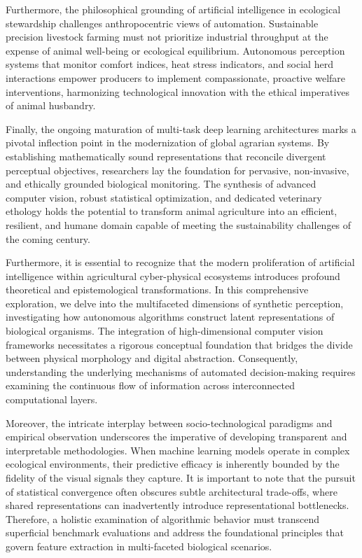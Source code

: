 \documentclass[Times,12pt,oneside,openany,print,index]{report}
\begin{document}
Furthermore, the philosophical grounding of artificial intelligence in ecological stewardship challenges anthropocentric views of automation. Sustainable precision livestock farming must not prioritize industrial throughput at the expense of animal well-being or ecological equilibrium. Autonomous perception systems that monitor comfort indices, heat stress indicators, and social herd interactions empower producers to implement compassionate, proactive welfare interventions, harmonizing technological innovation with the ethical imperatives of animal husbandry.

Finally, the ongoing maturation of multi-task deep learning architectures marks a pivotal inflection point in the modernization of global agrarian systems. By establishing mathematically sound representations that reconcile divergent perceptual objectives, researchers lay the foundation for pervasive, non-invasive, and ethically grounded biological monitoring. The synthesis of advanced computer vision, robust statistical optimization, and dedicated veterinary ethology holds the potential to transform animal agriculture into an efficient, resilient, and humane domain capable of meeting the sustainability challenges of the coming century.

Furthermore, it is essential to recognize that the modern proliferation of artificial intelligence within agricultural cyber-physical ecosystems introduces profound theoretical and epistemological transformations. In this comprehensive exploration, we delve into the multifaceted dimensions of synthetic perception, investigating how autonomous algorithms construct latent representations of biological organisms. The integration of high-dimensional computer vision frameworks necessitates a rigorous conceptual foundation that bridges the divide between physical morphology and digital abstraction. Consequently, understanding the underlying mechanisms of automated decision-making requires examining the continuous flow of information across interconnected computational layers.

Moreover, the intricate interplay between socio-technological paradigms and empirical observation underscores the imperative of developing transparent and interpretable methodologies. When machine learning models operate in complex ecological environments, their predictive efficacy is inherently bounded by the fidelity of the visual signals they capture. It is important to note that the pursuit of statistical convergence often obscures subtle architectural trade-offs, where shared representations can inadvertently introduce representational bottlenecks. Therefore, a holistic examination of algorithmic behavior must transcend superficial benchmark evaluations and address the foundational principles that govern feature extraction in multi-faceted biological scenarios.
\end{document}
